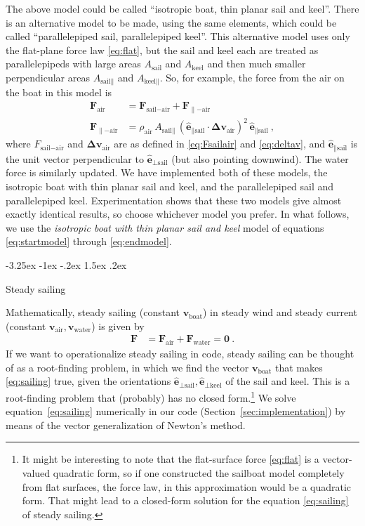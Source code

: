 \documentclass[letterpaper]{article}
\makeatletter
\renewcommand{\vec}[1]{\boldsymbol{#1}}
\newcommand{\uvec}{\vec{\hat{e}}}
\newcommand{\air}{\text{air}}
\newcommand{\water}{\text{water}}
\newcommand{\boat}{\text{boat}}
\newcommand{\sail}{\text{sail}}
\newcommand{\keel}{\text{keel}}
\newcommand{\vair}{\vec{v}_\air}
\newcommand{\vwater}{\vec{v}_\water}
\newcommand{\vboat}{\vec{v}_\boat}
\newcommand{\secref}[1]{Section~\ref{#1}}
\renewcommand\section{\@startsection {section}{1}{\z@}%
  {-3.25ex \@plus -1ex \@minus -.2ex}%
  {1.5ex \@plus .2ex}%
  {\raggedright\normalfont\large\bfseries}}
\makeatother
\begin{document}
The above model could be called ``isotropic boat, thin planar sail and keel''.
There is an alternative model to be made, using the same elements, which could be called ``parallelepiped sail, parallelepiped keel''.
This alternative model uses only the flat-plane force law \eqref{eq:flat}, but the sail and keel each are treated as parallelepipeds with large areas $A_\sail$ and $A_\keel$ and then much smaller perpendicular areas $A_{\sail\parallel}$ and $A_{\keel\parallel}$.
So, for example, the force from the air on the boat in this model is
\begin{align}
  \vec{F}_\air &= \vec{F}_{\sail-\air} + \vec{F}_{\parallel-\air}
  \\
  \vec{F}_{\parallel-\air} & = \rho_\air\,A_{\sail\parallel}\,(\uvec_{\parallel\sail}\cdot\vec{\Delta v}_\air)^2\,\uvec_{\parallel\sail}
   ~,
\end{align}
where $F_{\sail-\air}$ and $\vec{\Delta v}_\air$ are as defined in \eqref{eq:Fsailair} and \eqref{eq:deltav}, and $\uvec_{\parallel\sail}$ is the unit vector perpendicular to $\uvec_{\perp\sail}$ (but also pointing downwind).
The water force is similarly updated.
We have implemented both of these models, the isotropic boat with thin planar sail and keel, and the parallelepiped sail and parallelepiped keel.
Experimentation shows that these two models give almost exactly identical results, so choose whichever model you prefer.
In what follows, we use the \emph{isotropic boat with thin planar sail and keel} model of equations \eqref{eq:startmodel} through \eqref{eq:endmodel}.

\section{Steady sailing}\label{sec:steady}

Mathematically, steady sailing (constant $\vboat$) in steady wind and steady current (constant $\vair, \vwater$) is given by
\begin{align}\label{eq:sailing}
    \vec{F} &= \vec{F}_\air + \vec{F}_\water = \vec{0} ~.
\end{align}
If we want to operationalize steady sailing in code, steady sailing can be thought of as a root-finding problem, in which we find the vector $\vboat$ that makes \eqref{eq:sailing} true, given the orientations $\uvec_{\perp\sail}, \uvec_{\perp\keel}$ of the sail and keel.
This is a root-finding problem that (probably) has no closed form.\footnote{%
It might be interesting to note that the flat-surface force \eqref{eq:flat} is a vector-valued quadratic form, so if one constructed the sailboat model completely from flat surfaces, the force law, in this approximation would be a quadratic form.
That might lead to a closed-form solution for the equation \eqref{eq:sailing} of steady sailing.}
We solve equation~\eqref{eq:sailing} numerically in our code (\secref{sec:implementation})
by means of the vector generalization of Newton's method.
\end{document}
